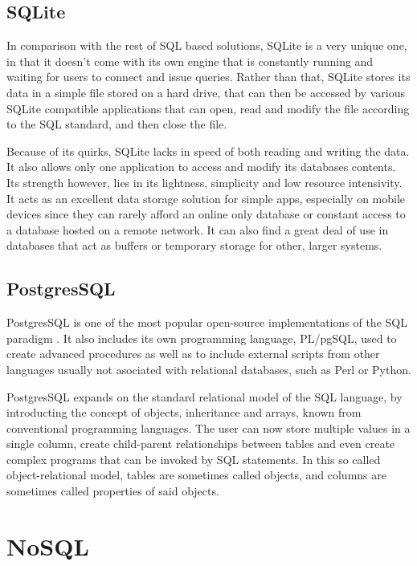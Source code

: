 %
%
\subsection{SQLite}
\label{subsec:background:first_subsection}
In comparison with the rest of SQL based solutions, SQLite is a very unique one, in that it doesn't come with its own engine that is constantly running and waiting for users to connect and issue queries. Rather than that, SQLite stores its data in a simple file stored on a hard drive, that can then be accessed by various SQLite compatible applications that can open, read and modify the file according to the SQL standard, and then close the file.

Because of its quirks, SQLite lacks in speed of both reading and writing the data. It also allows only one application to access and modify its databases contents. Its strength however, lies in its lightness, simplicity and low resource intensivity. It acts as an excellent data storage solution for simple apps, especially on mobile devices since they can rarely afford an online only database or constant access to a database hosted on a remote network. It can also find a great deal of use in databases that act as buffers or temporary storage for other, larger systems.

\subsection{PostgresSQL}
\label{subsec:background:second_section:second_subsection}
PostgresSQL is one of the most popular open-source implementations of the SQL paradigm \citep{worsleyPostgresSQL}. It also includes its own programming language, PL/pgSQL, used to create advanced procedures as well as to include external scripts from other languages usually not asociated with relational databases, such as Perl or Python. 

PostgresSQL expands on the standard relational model of the SQL language, by introducting the concept of objects, inheritance and arrays, known from conventional programming languages. The user can now store multiple values in a single column, create child-parent relationships between tables and even create complex programs that can be invoked by SQL statements. In this so called object-relational model, tables are sometimes called objects, and columns are sometimes called properties of said objects.

\section{NoSQL}
\label{sec:background:first_section}

